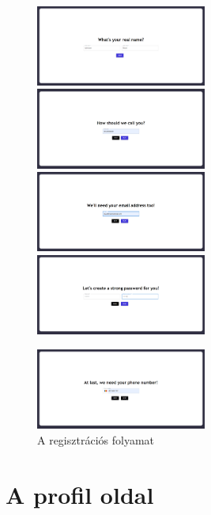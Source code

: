 \begin{figure}[h]
	\includegraphics[width=0.5\textwidth]{images/register_1.png}
	\includegraphics[width=0.5\textwidth]{images/register_2.png}
	\includegraphics[width=0.5\textwidth]{images/register_3.png}
	\includegraphics[width=0.5\textwidth]{images/register_4.png}
	\begin{center}
		\includegraphics[width=0.5\textwidth]{images/register_5.png}
	\end{center}
	\caption{A regisztrációs folyamat}
	\label{fig:registration_seq}
\end{figure}

\newpage

\section{A profil oldal}

